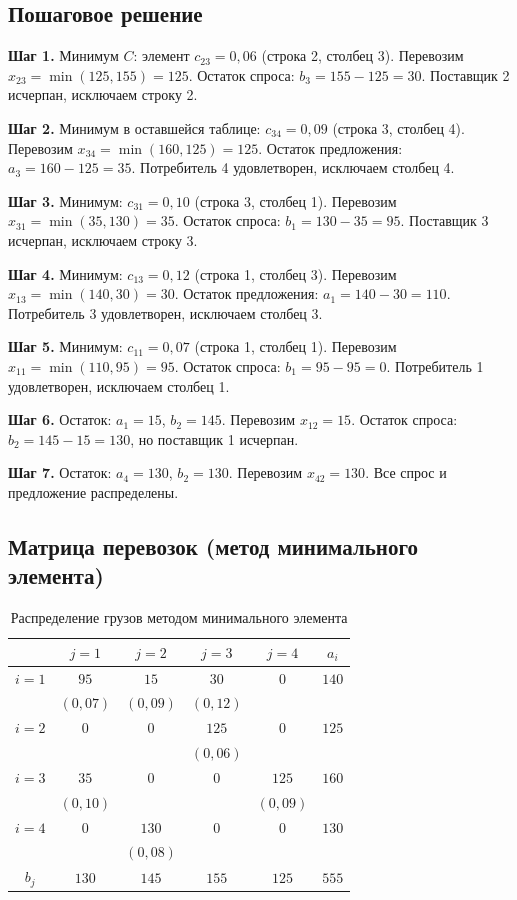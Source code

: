 \documentclass[a4paper, final]{article}
\begin{document}
\subsection{Пошаговое решение}

\textbf{Шаг 1.} Минимум $C$: элемент $c_{23} = 0{,}06$ (строка 2, столбец 3).
Перевозим $x_{23} = \min(125, 155) = 125$. Остаток спроса: $b_3 = 155 - 125 = 30$.
Поставщик 2 исчерпан, исключаем строку 2.

\textbf{Шаг 2.} Минимум в оставшейся таблице: $c_{34} = 0{,}09$ (строка 3, столбец 4).
Перевозим $x_{34} = \min(160, 125) = 125$. Остаток предложения: $a_3 = 160 - 125 = 35$.
Потребитель 4 удовлетворен, исключаем столбец 4.

\textbf{Шаг 3.} Минимум: $c_{31} = 0{,}10$ (строка 3, столбец 1).
Перевозим $x_{31} = \min(35, 130) = 35$. Остаток спроса: $b_1 = 130 - 35 = 95$.
Поставщик 3 исчерпан, исключаем строку 3.

\textbf{Шаг 4.} Минимум: $c_{13} = 0{,}12$ (строка 1, столбец 3).
Перевозим $x_{13} = \min(140, 30) = 30$. Остаток предложения: $a_1 = 140 - 30 = 110$.
Потребитель 3 удовлетворен, исключаем столбец 3.

\textbf{Шаг 5.} Минимум: $c_{11} = 0{,}07$ (строка 1, столбец 1).
Перевозим $x_{11} = \min(110, 95) = 95$. Остаток спроса: $b_1 = 95 - 95 = 0$.
Потребитель 1 удовлетворен, исключаем столбец 1.

\textbf{Шаг 6.} Остаток: $a_1 = 15$, $b_2 = 145$. Перевозим $x_{12} = 15$.
Остаток спроса: $b_2 = 145 - 15 = 130$, но поставщик 1 исчерпан.

\textbf{Шаг 7.} Остаток: $a_4 = 130$, $b_2 = 130$. Перевозим $x_{42} = 130$.
Все спрос и предложение распределены.

\subsection{Матрица перевозок (метод минимального элемента)}

\begin{table}[h!]
\centering
\caption{Распределение грузов методом минимального элемента}
\label{tab:min_elem}
\renewcommand{\arraystretch}{1.3}
\begin{tabular}{|c|c|c|c|c|c|}
\hline
 & $j=1$ & $j=2$ & $j=3$ & $j=4$ & $a_i$ \\
\hline
$i=1$ & $95$ & $15$ & $30$ & $0$ & $140$ \\
      & $(0{,}07)$ & $(0{,}09)$ & $(0{,}12)$ &  &  \\
\hline
$i=2$ & $0$ & $0$ & $125$ & $0$ & $125$ \\
      &  &  & $(0{,}06)$ &  &  \\
\hline
$i=3$ & $35$ & $0$ & $0$ & $125$ & $160$ \\
      & $(0{,}10)$ &  &  & $(0{,}09)$ &  \\
\hline
$i=4$ & $0$ & $130$ & $0$ & $0$ & $130$ \\
      &  & $(0{,}08)$ &  &  &  \\
\hline
$b_j$ & $130$ & $145$ & $155$ & $125$ & $555$ \\
\hline
\end{tabular}
\end{table}
\end{document}
